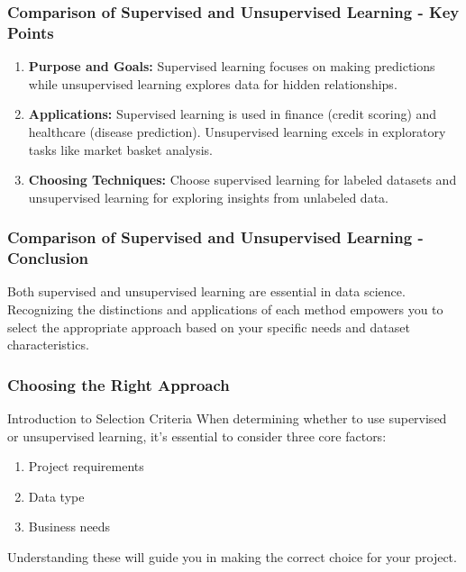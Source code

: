 \documentclass[aspectratio=169]{beamer}
\begin{document}
\begin{frame}[fragile]
    \frametitle{Comparison of Supervised and Unsupervised Learning - Key Points}
    \begin{enumerate}
        \item \textbf{Purpose and Goals:}  
            Supervised learning focuses on making predictions while unsupervised learning explores data for hidden relationships.
        
        \item \textbf{Applications:}  
            Supervised learning is used in finance (credit scoring) and healthcare (disease prediction). 
            Unsupervised learning excels in exploratory tasks like market basket analysis.
        
        \item \textbf{Choosing Techniques:}  
            Choose supervised learning for labeled datasets and unsupervised learning for exploring insights from unlabeled data.
    \end{enumerate}
\end{frame}

\begin{frame}[fragile]
    \frametitle{Comparison of Supervised and Unsupervised Learning - Conclusion}
    Both supervised and unsupervised learning are essential in data science.  
    Recognizing the distinctions and applications of each method empowers you to select the appropriate approach  
    based on your specific needs and dataset characteristics.
\end{frame}

\begin{frame}[fragile]
    \frametitle{Choosing the Right Approach}
    \begin{block}{Introduction to Selection Criteria}
        When determining whether to use supervised or unsupervised learning, it’s essential to consider three core factors: 
        \begin{enumerate}
            \item Project requirements
            \item Data type
            \item Business needs
        \end{enumerate}
        Understanding these will guide you in making the correct choice for your project.
    \end{block}
\end{frame}
\end{document}
